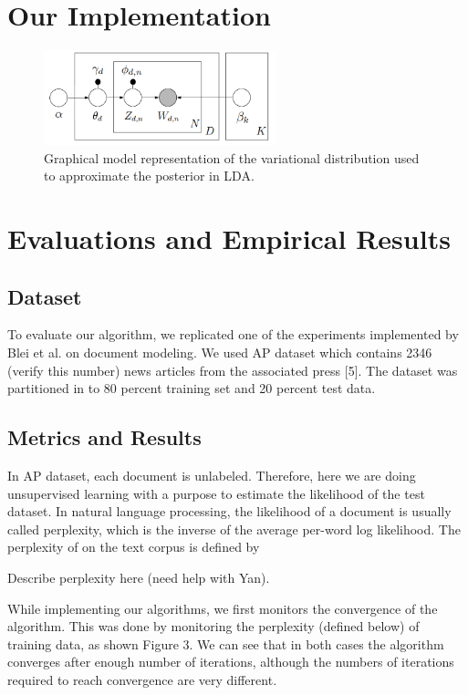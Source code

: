 \documentclass{article} %
\begin{document}
\section{Our Implementation}
\begin{figure}
    \centering
    \includegraphics[width=0.6\textwidth]{vi}
    \caption{Graphical model representation of the variational distribution used to approximate the posterior in LDA.}
    \label{fig:graphmodel}
\end{figure}


\section{Evaluations and Empirical Results}
\subsection{Dataset}
To evaluate our algorithm, we replicated one of the experiments implemented by Blei et al. on document modeling. We used AP dataset which contains 2346 (verify this number) news articles from the associated press [5]. The dataset was partitioned in to 80 percent training set and 20 percent test data.

\subsection{Metrics and Results}
In AP dataset, each document is unlabeled. Therefore, here we are doing unsupervised learning with a purpose to estimate the likelihood of the test dataset. In natural language processing, the likelihood of a document is usually called perplexity, which is the inverse of the average per-word log likelihood. The perplexity of on the text corpus is defined by

Describe perplexity here (need help with Yan).

While implementing our algorithms, we first monitors the convergence of the algorithm. This was done by monitoring the perplexity (defined below) of training data, as shown Figure 3. We can see that in both cases the algorithm converges after enough number of iterations, although the numbers of iterations required to reach convergence are very different.
\end{document}
